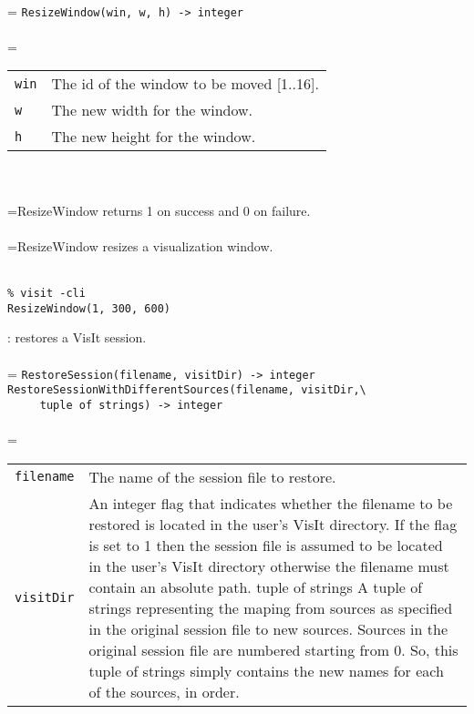 \documentclass[10pt,a4paper]{report}
\begin{document}
 \\ 
\hangindent=\parindent 
\verb!ResizeWindow(win, w, h) -> integer!\\ [-3mm]

 \\ 
\hangindent=\parindent 
\begin{tabular}{lp{9cm}}
\verb!win! & The id of the window to be moved [1..16]. \\
\verb!w! & The new width for the window. \\
\verb!h! & The new height for the window. \\
\end{tabular} \\[-2mm]


 \\ 
\hangindent=\parindent ResizeWindow returns 1 on success and 0 on failure. \\[-3mm] 

 \\ 
\hangindent=\parindent ResizeWindow resizes a visualization window. \\[-3mm] 

\\[-6mm]
\begin{verbatim}% visit -cli
ResizeWindow(1, 300, 600)
\end{verbatim}
\newpage


{}
: restores a VisIt session.\\[-3mm]

 \\ 
\hangindent=\parindent 
\verb!RestoreSession(filename, visitDir) -> integer!\\
\verb!RestoreSessionWithDifferentSources(filename, visitDir,\ ! \\ 
\verb!     tuple of strings) -> integer!\\ [-3mm]

 \\ 
\hangindent=\parindent 
\begin{tabular}{lp{9cm}}
\verb!filename! & The name of the session file to restore. \\
\verb!visitDir! & An integer flag that indicates whether the filename to be restored is located in the user's VisIt directory. If the flag is set to 1 then the session file is assumed to be located in the user's VisIt directory otherwise the filename must contain an absolute path. tuple of strings A tuple of strings representing the maping from sources as specified in the original session file to new sources. Sources in the original session file are numbered starting from 0. So, this tuple of strings simply contains the new names for each of the sources, in order. \\
\end{tabular} \\[-2mm]
\end{document}
